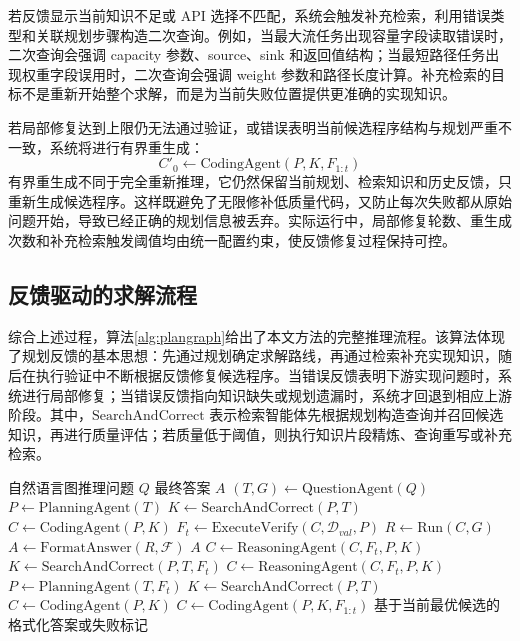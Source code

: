 若反馈显示当前知识不足或 API 选择不匹配，系统会触发补充检索，利用错误类型和关联规划步骤构造二次查询。例如，当最大流任务出现容量字段读取错误时，二次查询会强调 capacity 参数、source、sink 和返回值结构；当最短路径任务出现权重字段误用时，二次查询会强调 weight 参数和路径长度计算。补充检索的目标不是重新开始整个求解，而是为当前失败位置提供更准确的实现知识。

若局部修复达到上限仍无法通过验证，或错误表明当前候选程序结构与规划严重不一致，系统将进行有界重生成：
\begin{equation}
C'_0\leftarrow \mathrm{CodingAgent}(P,K,F_{1:t})
\end{equation}
有界重生成不同于完全重新推理，它仍然保留当前规划、检索知识和历史反馈，只重新生成候选程序。这样既避免了无限修补低质量代码，又防止每次失败都从原始问题开始，导致已经正确的规划信息被丢弃。实际运行中，局部修复轮数、重生成次数和补充检索触发阈值均由统一配置约束，使反馈修复过程保持可控。

\subsection{反馈驱动的求解流程}

综合上述过程，算法\ref{alg:plangraph}给出了本文方法的完整推理流程。该算法体现了规划反馈的基本思想：先通过规划确定求解路线，再通过检索补充实现知识，随后在执行验证中不断根据反馈修复候选程序。当错误反馈表明下游实现问题时，系统进行局部修复；当错误反馈指向知识缺失或规划遗漏时，系统才回退到相应上游阶段。其中，$\mathrm{SearchAndCorrect}$ 表示检索智能体先根据规划构造查询并召回候选知识，再进行质量评估；若质量低于阈值，则执行知识片段精炼、查询重写或补充检索。

\begin{algorithm}[!htbp]
\small
\caption{基于规划反馈的图推理协同求解流程}
\label{alg:plangraph}
\begin{algorithmic}[1]
\Require 自然语言图推理问题 $Q$
\Ensure 最终答案 $A$
\State $(T,G) \gets \mathrm{QuestionAgent}(Q)$
\State $P \gets \mathrm{PlanningAgent}(T)$
\State $K \gets \mathrm{SearchAndCorrect}(P,T)$
\State $C \gets \mathrm{CodingAgent}(P,K)$
    \State $F_t \gets \mathrm{ExecuteVerify}(C,\mathcal{D}_{val},P)$
        \State $R \gets \mathrm{Run}(C,G)$
        \State $A \gets \mathrm{FormatAnswer}(R,\mathcal{F})$
        \State \Return $A$
        \State $C \gets \mathrm{ReasoningAgent}(C,F_t,P,K)$
        \State $K \gets \mathrm{SearchAndCorrect}(P,T,F_t)$
        \State $C \gets \mathrm{ReasoningAgent}(C,F_t,P,K)$
        \State $P \gets \mathrm{PlanningAgent}(T,F_t)$
        \State $K \gets \mathrm{SearchAndCorrect}(P,T)$
        \State $C \gets \mathrm{CodingAgent}(P,K)$
    \EndIf
        \State $C \gets \mathrm{CodingAgent}(P,K,F_{1:t})$
    \EndIf
\EndFor
\State \Return 基于当前最优候选的格式化答案或失败标记
\end{algorithmic}
\end{algorithm}

